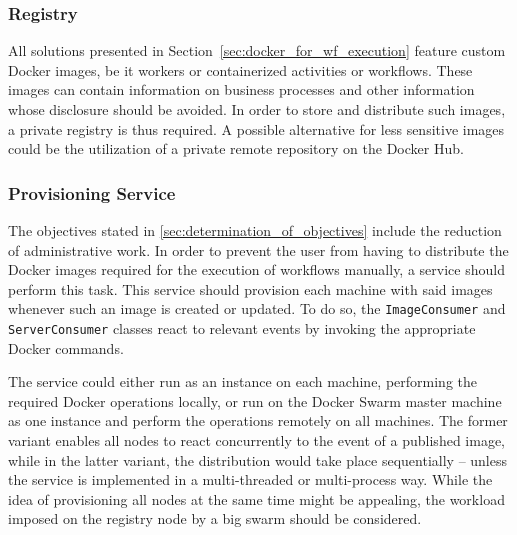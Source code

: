   \subsubsection{Registry} %
  \label{subs:registry}
    All solutions presented in Section~\ref{sec:docker_for_wf_execution} feature custom Docker images, be it workers or containerized activities or workflows. These images can contain information on business processes and other information whose disclosure should be avoided. In order to store and distribute such images, a private registry is thus required. A possible alternative for less sensitive images could be the utilization of a private remote repository on the Docker Hub.

  \subsubsection{Provisioning Service} %
    \label{subs:provisioning_service}
    The objectives stated in \ref{sec:determination_of_objectives} include the reduction of administrative work. In order to prevent the user from having to distribute the Docker images required for the execution of workflows manually, a service should perform this task. This service should provision each machine with said images whenever such an image is created or updated. To do so, the \texttt{ImageConsumer} and \texttt{ServerConsumer} classes react to relevant events by invoking the appropriate Docker commands.

    The service could either run as an instance on each machine, performing the required Docker operations locally, or run on the Docker Swarm master machine as one instance and perform the operations remotely on all machines. The former variant enables all nodes to react concurrently to the event of a published image, while in the latter variant, the distribution would take place sequentially -- unless the service is implemented in a multi-threaded or multi-process way. While the idea of provisioning all nodes at the same time might be appealing, the workload imposed on the registry node by a big swarm should be considered.


